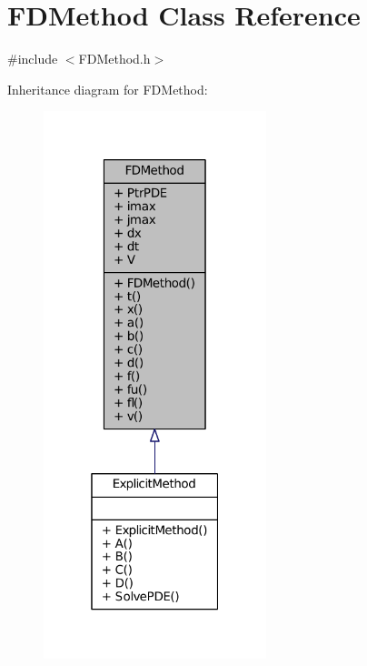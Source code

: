 \hypertarget{classFDMethod}{\section{F\+D\+Method Class Reference}
\label{classFDMethod}
}


{\ttfamily \#include $<$F\+D\+Method.\+h$>$}



Inheritance diagram for F\+D\+Method\+:\nopagebreak
\begin{figure}[H]
\begin{center}
\leavevmode
\includegraphics[width=184pt]{classFDMethod__inherit__graph}
\end{center}
\end{figure}


